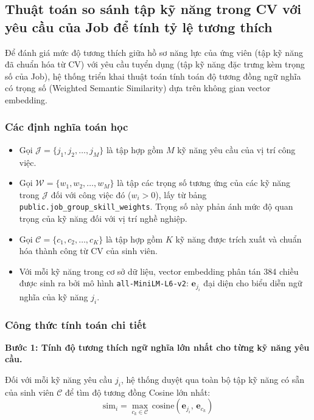 \subsection{Thuật toán so sánh tập kỹ năng trong CV với yêu cầu của Job để tính tỷ lệ tương thích}

Để đánh giá mức độ tương thích giữa hồ sơ năng lực của ứng viên (tập kỹ năng đã chuẩn hóa từ CV) với yêu cầu tuyển dụng (tập kỹ năng đặc trưng kèm trọng số của Job), hệ thống triển khai thuật toán tính toán độ tương đồng ngữ nghĩa có trọng số (Weighted Semantic Similarity) dựa trên không gian vector embedding.

\subsubsection*{Các định nghĩa toán học}

\begin{itemize}
    \item Gọi $\mathcal{J} = \{j_1, j_2, \ldots, j_M\}$ là tập hợp gồm $M$ kỹ năng yêu cầu của vị trí công việc.
    \item Gọi $\mathcal{W} = \{w_1, w_2, \ldots, w_M\}$ là tập các trọng số tương ứng của các kỹ năng trong $\mathcal{J}$ đối với công việc đó ($w_i > 0$), lấy từ bảng \texttt{public.job\_group\_skill\_weights}. Trọng số này phản ánh mức độ quan trọng của kỹ năng đối với vị trí nghề nghiệp.
    \item Gọi $\mathcal{C} = \{c_1, c_2, \ldots, c_K\}$ là tập hợp gồm $K$ kỹ năng được trích xuất và chuẩn hóa thành công từ CV của sinh viên.
    \item Với mỗi kỹ năng trong cơ sở dữ liệu, vector embedding phân tán 384 chiều được sinh ra bởi mô hình \texttt{all-MiniLM-L6-v2}: $\mathbf{e}_{j_i}$ đại diện cho biểu diễn ngữ nghĩa của kỹ năng $j_i$.
\end{itemize}

\subsubsection*{Công thức tính toán chi tiết}

\textbf{Bước 1: Tính độ tương thích ngữ nghĩa lớn nhất cho từng kỹ năng yêu cầu.}

Đối với mỗi kỹ năng yêu cầu $j_i$, hệ thống duyệt qua toàn bộ tập kỹ năng có sẵn của sinh viên $\mathcal{C}$ để tìm độ tương đồng Cosine lớn nhất:
\begin{equation}
    \text{sim}_i = \max_{c_k \in \mathcal{C}} \, \text{cosine}(\mathbf{e}_{j_i},\, \mathbf{e}_{c_k})
\end{equation}

